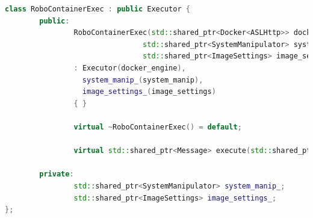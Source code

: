 \documentclass[a4paper, 14pt]{extreport}
\begin{document}
\begin{lstlisting}[language=C++, frame=single, xleftmargin=15pt, caption={Заголовочный файл класса RoboContainerExec},label=DescriptiveLabel]
class RoboContainerExec : public Executor {
        public:
                RoboContainerExec(std::shared_ptr<Docker<ASLHttp>> docker_engine,
                                std::shared_ptr<SystemManipulator> system_manip,
                                std::shared_ptr<ImageSettings> image_settings)
                : Executor(docker_engine),
                  system_manip_(system_manip),
                  image_settings_(image_settings)
                { }
        
                virtual ~RoboContainerExec() = default;
        
                virtual std::shared_ptr<Message> execute(std::shared_ptr<Message> msg) override;
        
        private:
                std::shared_ptr<SystemManipulator> system_manip_;
                std::shared_ptr<ImageSettings> image_settings_;
};
\end{lstlisting}
\end{document}
